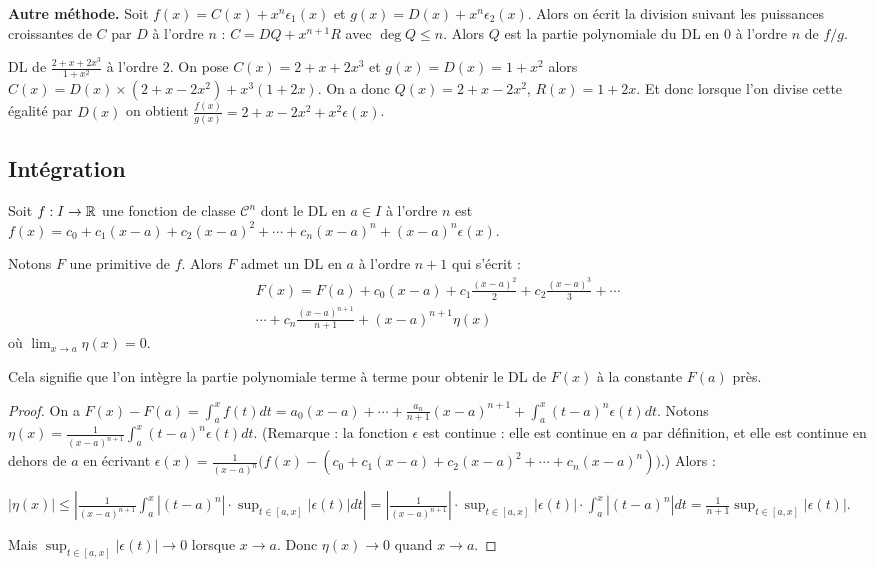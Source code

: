 \documentclass[class=report,crop=false]{standalone}
\begin{document}
\textbf{Autre méthode.}
Soit
$f(x)=C(x) + x^n\epsilon_1(x)$ et $g(x)=D(x) + x^n\epsilon_2(x)$.
Alors on écrit la division suivant les puissances croissantes de
$C$ par $D$ à l'ordre $n$ : $C=DQ+ x^{n+1}R$ avec $\deg Q \le n$.
Alors $Q$ est la partie polynomiale du DL en $0$ à l'ordre $n$ de $f/g$.

\begin{exemple}
DL de $\frac{2+x+2x^3}{1+x^2}$ à l'ordre $2$.
On pose $C(x)=2+x+2x^3$ et $g(x)=D(x)=1+x^2$ alors
$C(x)=D(x)\times (2+x-2x^2) + x^3(1+2x)$. On a donc $Q(x)=2+x-2x^2$,
$R(x) = 1+2x$. Et donc lorsque l'on divise cette égalité par $D(x)$ on obtient
$\frac{f(x)}{g(x)}=2+x-2x^2 + x^2\epsilon(x)$.
\end{exemple}


\subsection{Intégration}

Soit $f : I\to \mathbb{R}$ une fonction de classe $\mathcal{C}^n$ dont le DL
en $a\in I$ à l'ordre $n$ est $f(x)=c_0+c_1(x-a)+c_2(x-a)^2+\cdots+c_n(x-a)^n+(x-a)^n\epsilon(x)$.
\begin{theoreme}
Notons $F$ une primitive de $f$.
Alors $F$ admet un DL en $a$ à l'ordre $n+1$ qui s'écrit :
\begin{multline*}
F(x)=F(a)+c_0(x-a)+c_1\frac{(x-a)^2}{2}+ c_2\frac{(x-a)^3}{3}+\cdots \\
\cdots +c_n\frac{(x-a)^{n+1}}{n+1}+(x-a)^{n+1}\eta(x)  
\end{multline*}
où $\displaystyle\lim_{x\to a}\eta(x)=0$.
\end{theoreme}

Cela signifie que l'on intègre la partie polynomiale terme à terme pour obtenir le DL de $F(x)$ à la constante $F(a)$ près.

\begin{proof}
On a $F(x)-F(a)=\int_a^xf(t)dt
=a_0(x-a)+\cdots+\frac{a_n}{n+1}(x-a)^{n+1}+\int_a^x(t-a)^{n}
\epsilon(t)dt$.
Notons $\eta(x)=\frac{1}{(x-a)^{n+1}}\int_a^x(t-a)^{n}\epsilon(t)dt$.
(Remarque : la fonction $\epsilon$ est continue : elle est continue en $a$ par définition,  
et elle est continue en dehors de $a$ en écrivant 
$\epsilon(x) = \frac{1}{(x-a)^n}\big(f(x)-(c_0+c_1(x-a)+c_2(x-a)^2+\cdots+c_n(x-a)^n)\big)$.)
Alors :

$|\eta(x)|
  \le \left|\frac{1}{(x-a)^{n+1}} \int_a^x|(t-a)^{n}| \cdot \sup_{t\in[a,x]}|\epsilon(t)|dt\right|
=\left|\frac{1}{(x-a)^{n+1}}\right| \cdot \sup_{t\in[a,x]}|\epsilon(t)| \cdot \int_a^x|(t-a)^{n}| dt
=\frac{1}{n+1}\sup_{t\in[a,x]}|\epsilon(t)|$.

Mais $\sup_{t\in[a,x]}|\epsilon(t)| \to 0$ lorsque $x\to a$. Donc $\eta(x)\to 0$ quand $x\to a$.

\end{proof}
\end{document}
